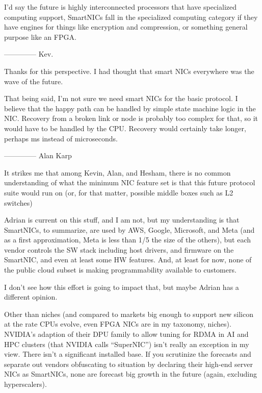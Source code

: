 \documentclass[../../../OAE-SPEC-MAIN.tex]{subfiles}
\begin{document}
I'd say the future is highly interconnected processors that have specialized computing support, SmartNICs fall in the specialized computing category if they have engines for things like encryption and compression, or something general purpose like an FPGA.

--------------
Kev.

\bigskip

Thanks for this perspective.  I had thought that smart NICs everywhere was the wave of the future.

That being said, I'm not sure we need smart NICs for the basic protocol.  I believe that the happy path can be handled by simple state machine logic in the NIC.  Recovery from a broken link or node is probably too complex for that, so it would have to be handled by the CPU.  Recovery would certainly take longer, perhaps ms instead of microseconds.

--------------
Alan Karp


It strikes me that among Kevin, Alan, and Hesham, there is no common understanding of what the minimum NIC feature set is that this future protocol suite would run on  (or, for that matter, possible middle boxes such as L2 switches)

Adrian is current on this stuff, and I am not, but my understanding is that SmartNICs, to summarize, are used by AWS, Google, Microsoft, and Meta (and as a first approximation, Meta is less than 1/5 the size of the others), but each vendor controls the SW stack including host drivers, and firmware on the SmartNIC, and even at least some HW features. And, at least for now, none of the public cloud subset is making programmability available to customers.

I don’t see how this effort is going to impact that, but maybe Adrian has a different opinion.

Other than niches (and compared to markets big enough to support new silicon at the rate CPUs evolve, even FPGA NICs are in my taxonomy, niches). NVIDIA’s adaption of their DPU family to allow tuning for RDMA in AI and HPC clusters (that NVIDIA calls “SuperNIC”) isn’t really an exception in my view.  There isn’t a significant installed base. If you scrutinize the forecasts and separate out vendors obfuscating to situation by declaring their high-end server NICs as SmartNICs, none are forecast big growth in the future (again, excluding hyperscalers).
\end{document}
